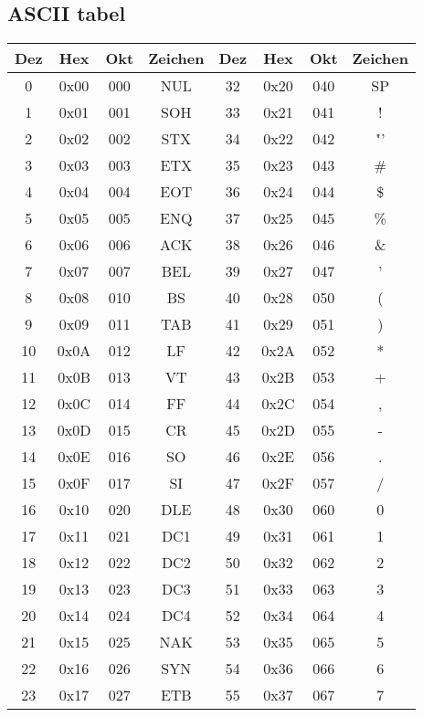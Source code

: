 \documentclass[a4paper]{scrartcl}
\begin{document}
    \subsection{ASCII tabel}
        \begin{longtable}{|c|c|c|c||c|c|c|c|}
        \hline
        Dez & Hex & Okt & Zeichen & Dez & Hex & Okt & Zeichen\\
        \hline
        0 & 0x00 & 000 & NUL & 32 & 0x20 & 040 & SP\\
        1 & 0x01 & 001 & SOH & 33 & 0x21 & 041 & ! \\
        2 & 0x02 & 002 & STX & 34 & 0x22 & 042 & "'\\
        3 & 0x03 & 003 & ETX & 35 & 0x23 & 043 & \# \\
        4 & 0x04 & 004 & EOT & 36 & 0x24 & 044 & \$ \\
        5 & 0x05 & 005 & ENQ & 37 & 0x25 & 045 & \% \\
        6 & 0x06 & 006 & ACK & 38 & 0x26 & 046 & \& \\
        7 & 0x07 & 007 & BEL & 39 & 0x27 & 047 & ' \\
        8 & 0x08 & 010 & BS & 40 & 0x28 & 050 & (  \\
        9 & 0x09 & 011 & TAB & 41 & 0x29 & 051 &  ) \\
        10 & 0x0A & 012 & LF & 42 & 0x2A & 052 & * \\
        11 & 0x0B & 013 & VT & 43 & 0x2B & 053 & + \\
        12 & 0x0C & 014 & FF & 44 & 0x2C & 054 & , \\
        13 & 0x0D & 015 & CR & 45 & 0x2D & 055 & - \\
        14 & 0x0E & 016 & SO & 46 & 0x2E & 056 & . \\
        15 & 0x0F & 017 & SI & 47 & 0x2F & 057 & / \\
        16 & 0x10 & 020 & DLE & 48 & 0x30 & 060 & 0 \\
        17 & 0x11 & 021 & DC1 & 49 & 0x31 & 061 & 1 \\
        18 & 0x12 & 022 & DC2 & 50 & 0x32 & 062 & 2 \\
        19 & 0x13 & 023 & DC3 & 51 & 0x33 & 063 & 3 \\
        20 & 0x14 & 024 & DC4 & 52 & 0x34 & 064 & 4 \\
        21 & 0x15 & 025 & NAK & 53 & 0x35 & 065 & 5 \\
        22 & 0x16 & 026 & SYN & 54 & 0x36 & 066 & 6 \\
        23 & 0x17 & 027 & ETB & 55 & 0x37 & 067 & 7 \\

\end{longtable}
\end{document}
